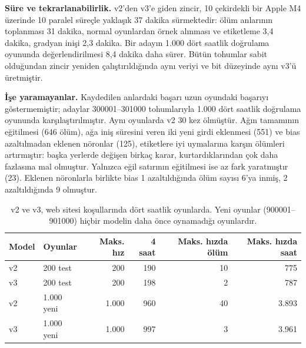 \documentclass[11pt,a4paper]{article}
\begin{document}
\textbf{Süre ve tekrarlanabilirlik.} v2'den v3'e giden zincir, 10 çekirdekli bir Apple M4 üzerinde 10 paralel süreçle yaklaşık 37 dakika sürmektedir: ölüm anlarının toplanması 31 dakika, normal oyunlardan örnek alınması ve etiketleme 3,4 dakika, gradyan inişi 2,3 dakika. Bir adayın 1.000 dört saatlik doğrulama oyununda değerlendirilmesi 8,4 dakika daha sürer. Bütün tohumlar sabit olduğundan zincir yeniden çalıştırıldığında aynı veriyi ve bit düzeyinde aynı v3'ü üretmiştir.

\textbf{İşe yaramayanlar.} Kaydedilen anlardaki başarı uzun oyundaki başarıyı göstermemiştir; adaylar 300001--301000 tohumlarıyla 1.000 dört saatlik doğrulama oyununda karşılaştırılmıştır. Aynı oyunlarda v2 30 kez ölmüştür. Ağın tamamının eğitilmesi (646 ölüm), ağa iniş süresini veren iki yeni girdi eklenmesi (551) ve bias azaltılmadan eklenen nöronlar (125), etiketlere iyi uymalarına karşın ölümleri artırmıştır: başka yerlerde değişen birkaç karar, kurtardıklarından çok daha fazlasına mal olmuştur. Yalnızca eğil satırının eğitilmesi ise az fark yaratmıştır (23). Eklenen nöronlarla birlikte bias 1 azaltıldığında ölüm sayısı 6'ya inmiş, 2 azaltıldığında 9 olmuştur.

\begin{table}[!htbp]
  \centering
  \small
  \caption{v2 ve v3, web sitesi koşullarında dört saatlik oyunlarda. Yeni oyunlar (900001--901000) hiçbir modelin daha önce oynamadığı oyunlardır.}
  \label{tab:v3}
  \begin{tabular}{@{}l l r r r r@{}}
    \toprule
    Model & Oyunlar & Maks. hız & 4 saat & Maks. hızda ölüm & Maks. hızda saat \\
    \midrule
    v2 & 200 test & 200 & 190 & 10 & 775 \\
    v3 & 200 test & 200 & 198 & 2 & 787 \\
    v2 & 1.000 yeni & 1.000 & 960 & 40 & 3.893 \\
    v3 & 1.000 yeni & 1.000 & 997 & 3 & 3.961 \\
    \bottomrule
  \end{tabular}
\end{table}
\FloatBarrier
\end{document}
